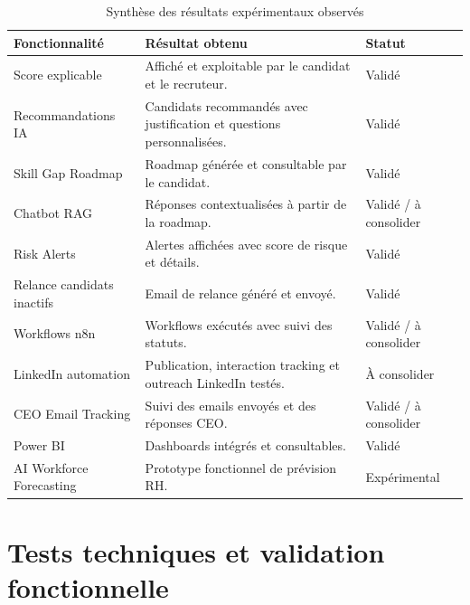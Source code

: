 \begin{table}[H]
\centering
\small
\renewcommand{\arraystretch}{1.25}
\begin{tabular}{|p{3.7cm}|p{7.3cm}|p{2.5cm}|}
\hline
\rowcolor{headerblue}
\textbf{Fonctionnalité} & \textbf{Résultat obtenu} & \textbf{Statut} \\
\hline
Score explicable & Affiché et exploitable par le candidat et le recruteur. & Validé \\
\hline
Recommandations IA & Candidats recommandés avec justification et questions personnalisées. & Validé \\
\hline
Skill Gap Roadmap & Roadmap générée et consultable par le candidat. & Validé \\
\hline
Chatbot RAG & Réponses contextualisées à partir de la roadmap. & Validé / à consolider \\
\hline
Risk Alerts & Alertes affichées avec score de risque et détails. & Validé \\
\hline
Relance candidats inactifs & Email de relance généré et envoyé. & Validé \\
\hline
Workflows n8n & Workflows exécutés avec suivi des statuts. & Validé / à consolider \\
\hline
LinkedIn automation & Publication, interaction tracking et outreach LinkedIn testés. & À consolider \\
\hline
CEO Email Tracking & Suivi des emails envoyés et des réponses CEO. & Validé / à consolider \\
\hline
Power BI & Dashboards intégrés et consultables. & Validé \\
\hline
AI Workforce Forecasting & Prototype fonctionnel de prévision RH. & Expérimental \\
\hline
\end{tabular}
\normalsize
\caption{Synthèse des résultats expérimentaux observés}
\end{table}


\section{Tests techniques et validation fonctionnelle}

